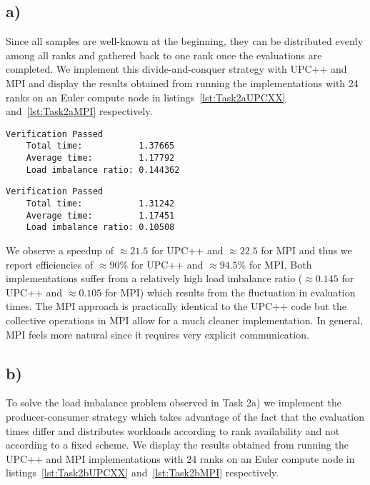\documentclass[11pt]{article}
\begin{document}
    \subsection*{a)}
    \label{subsec:Task2a}

    Since all samples are well-known at the beginning, they can be distributed
    evenly among all ranks and gathered back to one rank once the evaluations
    are completed.
    We implement this divide-and-conquer strategy with UPC++ and MPI and
    display the results obtained from running the implementations with 24
    ranks on an Euler compute node in listings~\ref{lst:Task2aUPCXX}
    and~\ref{lst:Task2aMPI} respectively.

    \begin{lstlisting}[basicstyle=\tiny, frame=single, caption={Output from
    executing the UPC++ tasking engine with the divide-and-conquer strategy.},
    label={lst:Task2aUPCXX}]
    Verification Passed
    Total time:           1.37665
    Average time:         1.17792
    Load imbalance ratio: 0.144362
    \end{lstlisting}

    \begin{lstlisting}[basicstyle=\tiny, frame=single, caption={Output from
    executing the MPI tasking engine with the divide-and-conquer strategy.},
    label={lst:Task2aMPI}]
    Verification Passed
    Total time:           1.31242
    Average time:         1.17451
    Load imbalance ratio: 0.10508
    \end{lstlisting}

    We observe a speedup of $\approx 21.5$ for UPC++ and $\approx 22.5$ for
    MPI and thus we report efficiencies of $\approx 90\%$ for UPC++ and
    $\approx 94.5\%$ for MPI.\@
    Both implementations suffer from a relatively high load imbalance ratio
    ($\approx 0.145$ for UPC++ and $\approx 0.105$ for MPI) which results
    from the fluctuation in evaluation times.
    The MPI approach is practically identical to the UPC++ code but the
    collective operations in MPI allow for a much cleaner implementation.
    In general, MPI feels more natural since it requires very explicit
    communication.

    \subsection*{b)}
    \label{subsec:Task2b}

    To solve the load imbalance problem observed in Task 2a) we implement
    the producer-consumer strategy which takes advantage of the fact that the
    evaluation times differ and distributes workloads
    according to rank availability and not according to a fixed scheme.
    We display the results obtained from running the UPC++ and MPI
    implementations with 24 ranks on an Euler compute node in
    listings~\ref{lst:Task2bUPCXX} and~\ref{lst:Task2bMPI} respectively.
\end{document}
